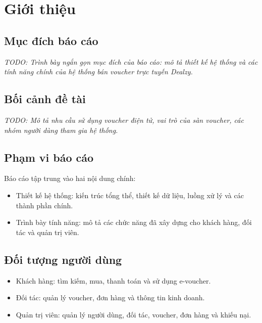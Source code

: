 \section{Giới thiệu}

\subsection{Mục đích báo cáo}
\textit{TODO: Trình bày ngắn gọn mục đích của báo cáo: mô tả thiết kế hệ thống và các tính năng chính của hệ thống bán voucher trực tuyến Dealzy.}

\subsection{Bối cảnh đề tài}
\textit{TODO: Mô tả nhu cầu sử dụng voucher điện tử, vai trò của sàn voucher, các nhóm người dùng tham gia hệ thống.}

\subsection{Phạm vi báo cáo}
Báo cáo tập trung vào hai nội dung chính:
\begin{itemize}
    \item Thiết kế hệ thống: kiến trúc tổng thể, thiết kế dữ liệu, luồng xử lý và các thành phần chính.
    \item Trình bày tính năng: mô tả các chức năng đã xây dựng cho khách hàng, đối tác và quản trị viên.
\end{itemize}

\subsection{Đối tượng người dùng}
\begin{itemize}
    \item Khách hàng: tìm kiếm, mua, thanh toán và sử dụng e-voucher.
    \item Đối tác: quản lý voucher, đơn hàng và thông tin kinh doanh.
    \item Quản trị viên: quản lý người dùng, đối tác, voucher, đơn hàng và khiếu nại.
\end{itemize}

